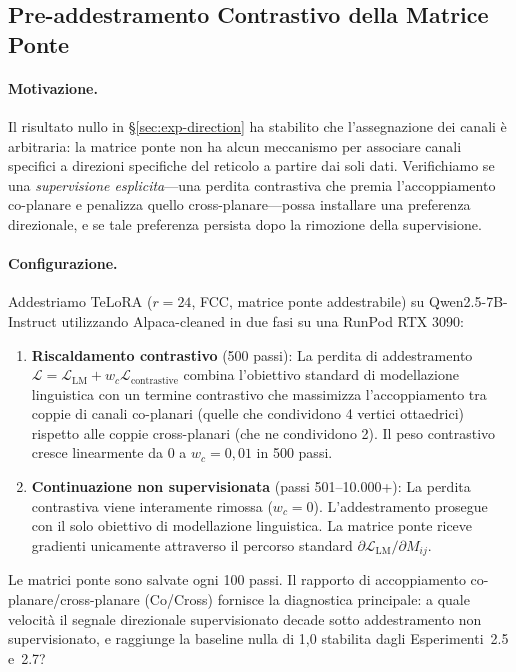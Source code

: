 \documentclass[11pt]{article}
\begin{document}
\subsection{Pre-addestramento Contrastivo della Matrice Ponte}
\label{sec:exp-contrastive}

\paragraph{Motivazione.}
Il risultato nullo in \S\ref{sec:exp-direction} ha stabilito che
l'assegnazione dei canali \`e arbitraria: la matrice ponte non ha alcun
meccanismo per associare canali specifici a direzioni specifiche del
reticolo a partire dai soli dati. Verifichiamo se una
\emph{supervisione esplicita}---una perdita contrastiva che premia
l'accoppiamento co-planare e penalizza quello cross-planare---possa
installare una preferenza direzionale, e se tale preferenza persista
dopo la rimozione della supervisione.

\paragraph{Configurazione.}
Addestriamo TeLoRA ($r\!=\!24$, FCC, matrice ponte addestrabile)
su Qwen2.5-7B-Instruct utilizzando Alpaca-cleaned in due fasi su una
RunPod RTX 3090:

\begin{enumerate}
\item \textbf{Riscaldamento contrastivo} (500 passi): La perdita di
addestramento
$\mathcal{L} = \mathcal{L}_\text{LM} + w_c \mathcal{L}_\text{contrastive}$
combina l'obiettivo standard di modellazione linguistica con un termine
contrastivo che massimizza l'accoppiamento tra coppie di canali
co-planari (quelle che condividono 4 vertici ottaedrici) rispetto alle
coppie cross-planari (che ne condividono 2). Il peso contrastivo cresce
linearmente da 0 a $w_c = 0{,}01$ in 500 passi.

\item \textbf{Continuazione non supervisionata} (passi 501--10.000+):
La perdita contrastiva viene interamente rimossa ($w_c = 0$).
L'addestramento prosegue con il solo obiettivo di modellazione
linguistica. La matrice ponte riceve gradienti unicamente attraverso il
percorso standard
$\partial\mathcal{L}_\text{LM}/\partial M_{ij}$.
\end{enumerate}

\noindent
Le matrici ponte sono salvate ogni 100 passi. Il rapporto di
accoppiamento co-planare/cross-planare (Co/Cross) fornisce la
diagnostica principale: a quale velocit\`a il segnale direzionale
supervisionato decade sotto addestramento non supervisionato, e
raggiunge la baseline nulla di 1,0 stabilita dagli Esperimenti~2.5
e~2.7?
\end{document}
